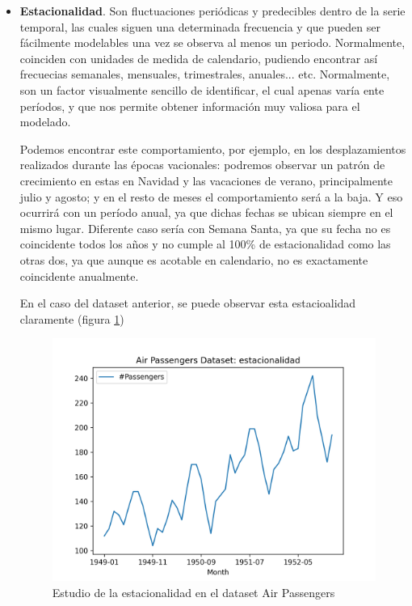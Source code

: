 \begin{itemize}
    \item \textbf{Estacionalidad}. Son fluctuaciones periódicas y predecibles dentro de la serie temporal, las cuales siguen una determinada frecuencia y que pueden ser fácilmente modelables una vez se observa al menos un periodo. Normalmente, coinciden con unidades de medida de calendario, pudiendo encontrar así frecuecias semanales, mensuales, trimestrales, anuales... etc. Normalmente, son un factor visualmente sencillo de identificar, el cual apenas varía ente períodos, y que nos permite obtener información muy valiosa para el modelado.

    Podemos encontrar este comportamiento, por ejemplo, en los desplazamientos realizados durante las épocas vacionales: podremos observar un patrón de crecimiento en estas en Navidad y las vacaciones de verano, principalmente julio y agosto; y en el resto de meses el comportamiento será a la baja. Y eso ocurrirá con un período anual, ya que dichas fechas se ubican siempre en el mismo lugar. Diferente caso sería con Semana Santa, ya que su fecha no es coincidente todos los años y no cumple al 100\% de estacionalidad como las otras dos, ya que aunque es acotable en calendario, no es exactamente coincidente anualmente.

    En el caso del dataset anterior, se puede observar esta estacioalidad claramente (figura \ref{season})

    \begin{figure}[h] %
        \centering
        \includegraphics[scale=0.6]{img/season}
        \caption{Estudio de la estacionalidad en el dataset Air Passengers}
        \label{season}
    \end{figure}


\end{itemize}
